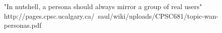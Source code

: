 "In nutshell, a persona should always mirror a group of real users" http://pages.cpsc.ucalgary.ca/~saul/wiki/uploads/CPSC681/topic-wan-personas.pdf

